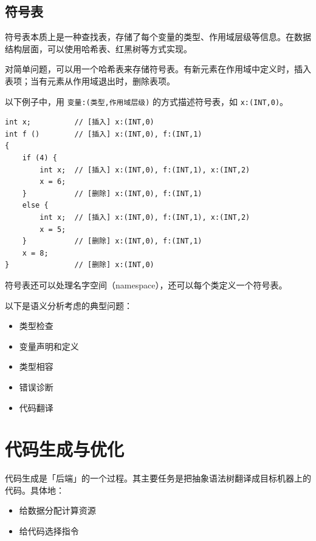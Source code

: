 \documentclass[UTF8]{ctexart}
\newcommand\Emph[1]{\textcolor{cyan!80!black}{#1}}
\begin{document}
\subsection{符号表}
\Emph{符号表}本质上是一种查找表，存储了每个变量的类型、作用域层级等信息。在数据结构层面，可以使用哈希表、红黑树等方式实现。

对简单问题，可以用一个哈希表来存储符号表。有新元素在作用域中定义时，插入表项；当有元素从作用域退出时，删除表项。

以下例子中，用 \verb!变量:(类型,作用域层级)! 的方式描述符号表，如 \verb!x:(INT,0)!。
\begin{lstlisting}
int x;          // [插入] x:(INT,0)
int f ()        // [插入] x:(INT,0), f:(INT,1)
{
    if (4) {
        int x;  // [插入] x:(INT,0), f:(INT,1), x:(INT,2)
        x = 6;
    }           // [删除] x:(INT,0), f:(INT,1)
    else {
        int x;  // [插入] x:(INT,0), f:(INT,1), x:(INT,2)
        x = 5;
    }           // [删除] x:(INT,0), f:(INT,1)
    x = 8;
}               // [删除] x:(INT,0)
\end{lstlisting}

符号表还可以处理名字空间（namespace），还可以每个类定义一个符号表。

以下是语义分析考虑的典型问题：
\begin{itemize}[itemsep=0pt, parsep=0pt,leftmargin=1.5cm]
  \item 类型检查
  \item 变量声明和定义
  \item 类型相容
  \item 错误诊断
  \item 代码翻译
\end{itemize}

\section{代码生成与优化}
代码生成是「后端」的一个过程。其主要任务是把\Emph{抽象语法树}翻译成\Emph{目标机器}上的代码。具体地：
\begin{itemize}[itemsep=0pt, parsep=0pt,leftmargin=1.5cm]
    \item 给数据分配计算资源
    \item 给代码选择指令
\end{itemize}
\end{document}
